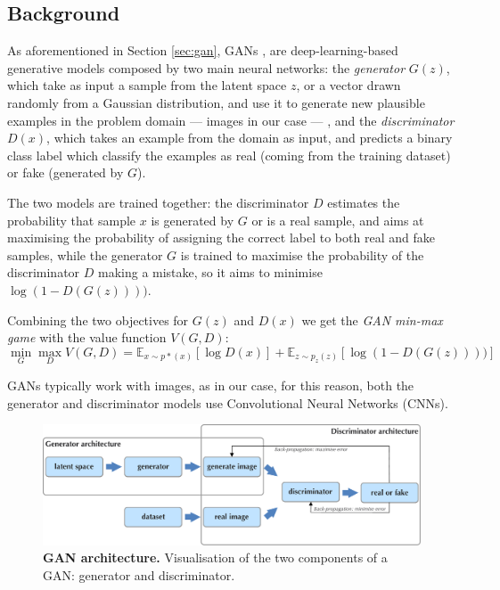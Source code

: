 \documentclass{article}
\begin{document}
	\subsection{Background} \label{subsec:app_background}
	As aforementioned in Section \ref{sec:gan}, GANs \cite{goodfellow2014generative}, are 
	deep-learning-based generative models composed by two main neural networks: 
	the \textit{generator} ${G(z)}$, which take as input a sample from the latent space $z$, or a vector 
	drawn randomly from a Gaussian distribution, and use it to generate new plausible examples in the 
	problem domain — images in our case — , and the \textit{discriminator} ${D(x)}$, which takes an 
	example from the domain as input, and predicts a binary class label which classify the examples as 
	real (coming from the training dataset) or fake (generated by $G$). 
	
	The two models are trained together: the discriminator $D$ estimates the probability that 
	sample $x$ is generated by $G$ or is a real sample, and aims at maximising the probability of 
	assigning the correct label to both real and fake samples, while the generator $G$ is trained to 
	maximise the probability of the discriminator $D$ making a mistake, so it aims to minimise 
	$\log(1-D(G(z))))$.
	
	Combining the two objectives for $G(z)$ and $D(x)$ we get the \textit{GAN min-max game} with the 
	value function $V(G,D)$:
	\begin{equation}
		\label{e:minmaxgame}
		\min_G \max_D V(G,D) = 
		\mathbb{E}_{x \sim p*(x)} [\log D(x)] + \mathbb E _{z \sim p_z(z)} [\log (1-D(G(z))))]
	\end{equation}
	
	GANs typically work with images, as in our case, for this reason, both the generator and 
	discriminator models use Convolutional Neural Networks (CNNs).
	\begin{figure}[htb]				
		\centering
		\includegraphics[width=.65\linewidth]{images/GAN}
		\caption{\textbf{GAN architecture.} Visualisation of the two components of a GAN: generator and 
			discriminator.}
		\label{fig:gan}
	\end{figure}
	
\end{document}
